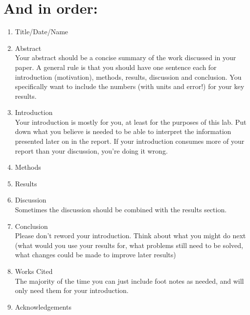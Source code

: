\documentclass[12pt]{article}
\begin{document}
\section*{And in order:}
\begin{enumerate}
  \item{Title/Date/Name}
  \item{Abstract} \\
    Your abstract should be a concise summary of the work discussed in your paper. A general rule is that you should have one sentence each for introduction (motivation), methods, results, discussion and conclusion. You specifically want to include the numbers (with units and error!) for your key results.
  \item{Introduction} \\
    Your introduction is mostly for you, at least for the purposes of this lab. Put down what you believe is needed to be able to interpret the information presented later on in the report. If your introduction consumes more of your report than your discussion, you're doing it wrong.
  \item{Methods}
  \item{Results}
  \item{Discussion} \\
    Sometimes the discussion should be combined with the results section.
  \item{Conclusion} \\
    Please don't reword your introduction. Think about what you might do next (what would you use your results for, what problems still need to be solved, what changes could be made to improve later results)
  \item{Works Cited} \\
    The majority of the time you can just include foot notes as needed, and will only need them for your introduction.
  \item{Acknowledgements}
\end{enumerate}
\end{document}
